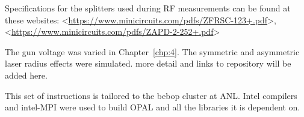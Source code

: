 \documentclass[table]{iitthesis}
\newcommand{\nrnote}[1]{\textsf{{\color{blue}{ NN note:}   #1 }}}
\begin{document}
Specifications for the splitters used during RF measurements can be found at these websites:
<\url{https://www.minicircuits.com/pdfs/ZFRSC-123+.pdf}>, \\
<\url{https://www.minicircuits.com/pdfs/ZAPD-2-252+.pdf}>


\label{gunsims}
The gun voltage was varied in Chapter~\ref{chp:4}. 
The symmetric and asymmetric laser radius effects were simulated.
 \nrnote{more detail and links to repository will be added here.}

 \label{build}
This set of instructions is tailored to the bebop cluster at ANL. 
Intel compilers and intel-MPI were used to build OPAL and all 
the libraries it is dependent on.
\end{document}
